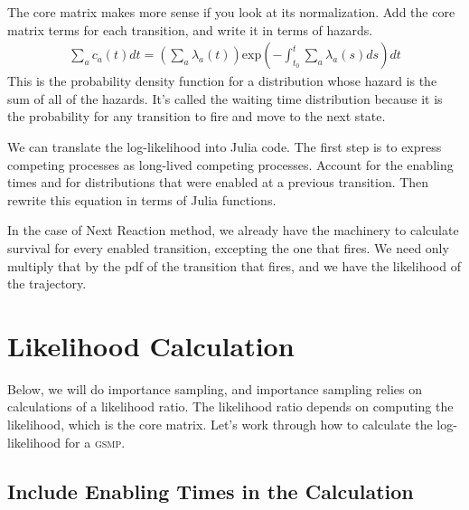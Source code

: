\documentclass{article}
\newcommand{\gsmp}{\textsc{gsmp}\xspace}
\begin{document}
The core matrix makes more sense if you look at its normalization. Add the core matrix terms for each transition, and write it in terms of hazards.
\begin{eqnarray}
	\sum_a c_a(t)dt = \left(\sum_a \lambda_a(t)\right)\mbox{exp}\left(-\int_{t_0}^t\sum_a \lambda_a(s)ds \right)dt
\end{eqnarray}
This is the probability density function for a distribution whose hazard is the sum of all of the hazards. It's called the waiting time distribution because it is the probability for any transition to fire and move to the next state.

We can translate the log-likelihood into Julia code. The first step is to express competing processes as long-lived competing processes. Account for the enabling times and for distributions that were enabled at a previous transition. Then rewrite this equation in terms of Julia functions.

In the case of Next Reaction method, we already have the machinery to calculate survival for every enabled transition, excepting the one that fires. We need only multiply that by the pdf of the transition that fires, and we have the likelihood of the trajectory.

\section{Likelihood Calculation}

Below, we will do importance sampling, and importance sampling relies on calculations of a likelihood ratio. The likelihood ratio depends on computing the likelihood, which is the core matrix. Let's work through how to calculate the log-likelihood for a \gsmp.

\subsection{Include Enabling Times in the Calculation}
\end{document}
